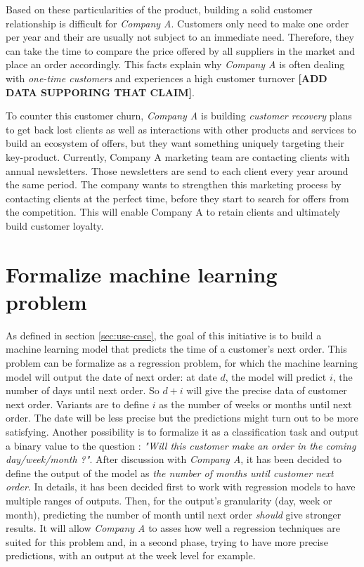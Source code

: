  Based on these particularities of the product, building a solid customer relationship is difficult for \textit{Company A}. Customers only need to make one order per year and their are usually not subject to an immediate need. Therefore, they can take the time to compare the price offered by all suppliers in the market and place an order accordingly. This facts explain why \textit{Company A} is often dealing with \textit{one-time customers} and experiences a high customer turnover \textbf{[ADD DATA SUPPORING THAT CLAIM]}.
 
 
 To counter this customer churn, \textit{Company A} is building \textit{customer recovery} plans to get back lost clients as well as interactions with other products and services to build an ecosystem of offers, but they want something uniquely targeting their key-product. Currently, Company A marketing team are contacting clients with annual newsletters. Those newsletters are send to each client every year around the same period. The company wants to strengthen this marketing process by contacting clients at the perfect time, before they start to search for offers from the competition. This will enable Company A to retain clients and ultimately build customer loyalty.
 
 
\section{Formalize machine learning problem} \label{sec:ml-metrics}

As defined in section \ref{sec:use-case}, the goal of this initiative is to build a machine learning model that predicts the time of a customer's next order. This problem can be formalize as a regression problem, for which the machine learning model will output the date of next order: at date $d$, the model will predict $i$, the number of days until next order. So $d+i$ will give the precise data of customer next order. Variants are to define $i$ as the number of weeks or months until next order. The date will be less precise but the predictions might turn out to be more satisfying. Another possibility is to formalize it as a classification task and output a binary value to the question : \textit{"Will this customer make an order in the coming day/week/month ?"}. After discussion with \textit{Company A}, it has been decided to define the output of the model as \textit{the number of months until customer next order}. In details, it has been decided first to work with regression models to have multiple ranges of outputs. Then, for the output's granularity (day, week or month), predicting the number of month until next order \textit{should} give stronger results. It will allow \textit{Company A} to asses how well a regression techniques are suited for this problem and, in a second phase, trying to have more precise predictions, with an output at the week level for example.

